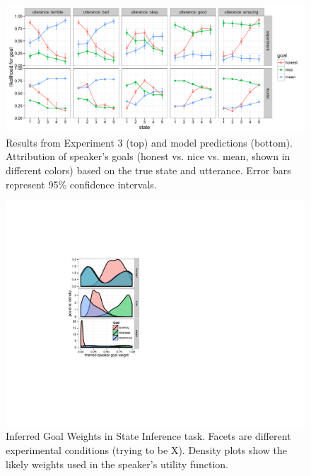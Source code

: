 \documentclass[10pt,letterpaper]{article}
\begin{document}
\begin{figure}[!t]
\begin{center}
  \includegraphics[width=\textwidth]{figures/exp2.pdf}
  \caption{\label{fig:exp2} Results from Experiment 3 (top) and model predictions (bottom). Attribution of speaker's goals (honest vs. nice vs. mean, shown in different colors) based on the true state and utterance. Error bars represent 95\% confidence intervals.}
  \end{center}
\end{figure}
\begin{figure}[!b] %
\begin{centering}
\includegraphics[width=0.70\columnwidth]{figures/goal-posterior.pdf}
\caption{\label{fig:goal-priors-bda} Inferred Goal Weights in State Inference task.
Facets are different experimental conditions (trying to be X). Density plots show the likely weights used in the speaker's utility function.
}
\end{centering}
\end{figure}
\end{document}
